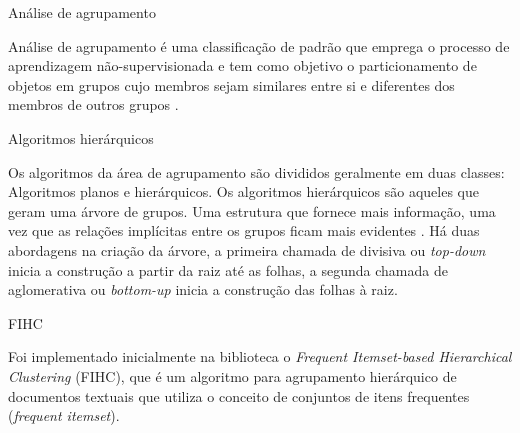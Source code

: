 \documentclass[final]{beamer}
\newlength{\onecolwid}
\newlength{\twocolwid}
\begin{document}
\begin{frame}[t]
\begin{columns}[t]
\begin{column}{\twocolwid}
\begin{columns}[t,totalwidth=\twocolwid]
\begin{column}{\onecolwid}\vspace{-.6in} %


\begin{block}{Análise de agrupamento}

Análise de agrupamento é uma classificação de padrão que emprega o processo de aprendizagem não-supervisionada e tem como objetivo o particionamento de objetos em grupos cujo membros sejam similares entre si e diferentes dos membros de outros grupos \cite{Jain:1999}.


\end{block}

\begin{block}{Algoritmos hierárquicos}

Os algoritmos da área de agrupamento são divididos geralmente em duas classes: Algoritmos planos e hierárquicos.
Os algoritmos hierárquicos são aqueles que geram uma árvore de grupos. Uma estrutura que fornece mais informação, uma vez que as relações implícitas entre os grupos ficam mais evidentes \cite{Manning:2009}.
Há duas abordagens na criação da árvore, a primeira chamada de divisiva ou \textit{top-down} inicia a construção a partir da raiz até as folhas, a segunda chamada de aglomerativa ou \textit{bottom-up} inicia a construção das folhas à raiz.

\end{block}


\begin{block}{FIHC}

Foi implementado inicialmente na biblioteca o \textit{Frequent Itemset-based Hierarchical Clustering} (FIHC), que é um algoritmo para agrupamento hierárquico de documentos textuais \cite{Martin:2004} que utiliza o conceito de conjuntos de itens frequentes (\textit{frequent itemset}).


\end{block}
\end{column}
\end{columns}
\end{column}
\end{columns}
\end{frame}
\end{document}
